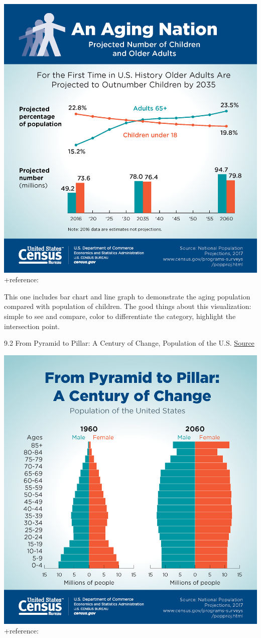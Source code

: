 \documentclass[]{book}
\theoremstyle{definition}
\theoremstyle{definition}
\theoremstyle{definition}
\theoremstyle{remark}
\begin{document}
\includegraphics{images/aging_nation.jpg} +reference:
\citep{aging_nation}

This one includes bar chart and line graph to demonstrate the aging
population compared with population of children. The good things about
this visualization: simple to see and compare, color to differentiate
the category, highlight the intersection point.

9.2 From Pyramid to Pillar: A Century of Change, Population of the U.S.
\href{https://www.census.gov/library/visualizations/2018/comm/century-of-change.html}{Source}

\includegraphics{images/Pyramid.jpg} +reference:
\citep{population_pyramid}
\end{document}
